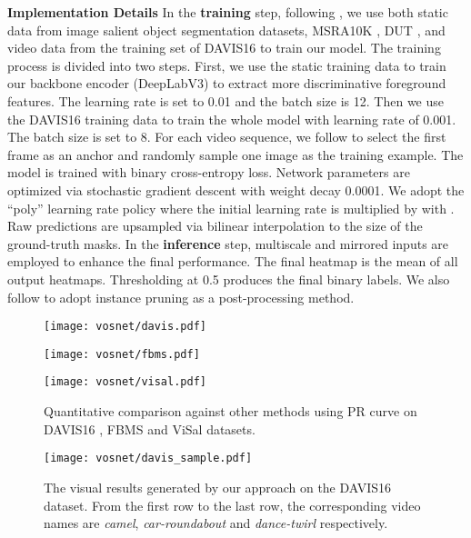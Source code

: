 \documentclass[runningheads]{llncs}
\begin{document}
\noindent \textbf{Implementation Details} In the \textbf{training} step, following \cite{vos_cosnet,vos_agnn,vos_pdb},  we use both static data from image salient object segmentation datasets, MSRA10K \cite{msra10k}, DUT \cite{duts}, and video data from the training set of DAVIS16 to train our model. The training process is divided into two steps. First, we use the static training data to train our backbone encoder (DeepLabV3) to extract more discriminative foreground features. The learning rate is set to 0.01 and the batch size is 12.  Then we use the DAVIS16 training data to train the whole model with learning rate of 0.001. The batch size is set to 8. For each video sequence, we follow \cite{vos_andiff} to select the first frame as an anchor and randomly sample one image as the training example. The model is trained with binary cross-entropy loss. Network parameters are optimized via stochastic gradient descent with weight decay 0.0001. We adopt the ``poly'' learning rate policy where the initial learning rate is multiplied by  with . Raw predictions are upsampled via bilinear interpolation to the size of the ground-truth masks. In the \textbf{inference} step, multiscale and mirrored inputs are employed to enhance the final performance.	The final heatmap is the mean of all output heatmaps. Thresholding at 0.5 produces the final binary labels. We also follow \cite{vos_andiff} to adopt instance pruning as a post-processing method.\\
\begin{figure*}[t!]
	\begin{minipage}[t]{0.32\linewidth} 
		\centering
		\texttt{[image: vosnet/davis.pdf]}
\end{minipage}
	\begin{minipage}[t]{0.32\linewidth} 
		\centering
		\texttt{[image: vosnet/fbms.pdf]}
\end{minipage} 
	\begin{minipage}[t]{0.32\linewidth} 
		\centering
		\texttt{[image: vosnet/visal.pdf]}
\end{minipage} 
	\caption{Quantitative comparison against other methods using PR curve on DAVIS16 \cite{davis_16}, FBMS \cite{fbms} and ViSal \cite{video_gafl} datasets. }
	\label{vos_pr}
\end{figure*}
\begin{figure*}[t!]
	\centering
	\texttt{[image: vosnet/davis\_sample.pdf]}
	\caption{The visual results generated by our approach on the DAVIS16 dataset. From the first row to the last row, the corresponding
		video names are \emph{camel}, \emph{car-roundabout} and \emph{dance-twirl} respectively.}
	\label{davis_sample}
\end{figure*}
\end{document}
